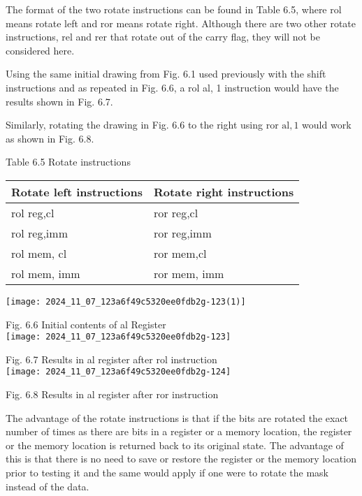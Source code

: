 \documentclass[10pt]{article}
\begin{document}
The format of the two rotate instructions can be found in Table 6.5, where rol means rotate left and ror means rotate right. Although there are two other rotate instructions, rel and rer that rotate out of the carry flag, they will not be considered here.

Using the same initial drawing from Fig. 6.1 used previously with the shift instructions and as repeated in Fig. 6.6, a rol al, 1 instruction would have the results shown in Fig. 6.7.

Similarly, rotating the drawing in Fig. 6.6 to the right using ror $\mathrm{al}, 1$ would work as shown in Fig. 6.8.

Table 6.5 Rotate instructions

\begin{center}
\begin{tabular}{|ll|}
\hline
Rotate left instructions & Rotate right instructions \\
\hline
rol reg,cl & ror reg,cl \\
rol reg,imm & ror reg,imm \\
rol mem, cl & ror mem,cl \\
rol mem, imm & ror mem, imm \\
\hline
\end{tabular}
\end{center}

\begin{center}
\texttt{[image: 2024\_11\_07\_123a6f49c5320ee0fdb2g-123(1)]}
\end{center}

Fig. 6.6 Initial contents of al Register\\
\texttt{[image: 2024\_11\_07\_123a6f49c5320ee0fdb2g-123]}

Fig. 6.7 Results in al register after rol instruction\\
\texttt{[image: 2024\_11\_07\_123a6f49c5320ee0fdb2g-124]}

Fig. 6.8 Results in al register after ror instruction

The advantage of the rotate instructions is that if the bits are rotated the exact number of times as there are bits in a register or a memory location, the register or the memory location is returned back to its original state. The advantage of this is that there is no need to save or restore the register or the memory location prior to testing it and the same would apply if one were to rotate the mask instead of the data.
\end{document}
